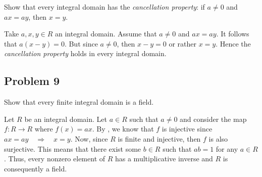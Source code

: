 \documentclass[../hw_sols.tex]{subfiles}
\begin{document}
Show that every integral domain has the \textit{cancellation property}: if 
$a \neq 0$ and $ax = ay$, then $x = y$.

\begin{solution}
Take $a,x,y \in R$ an integral domain. Assume that $a \neq 0$ and $ax = ay$. 
It follows that $a(x - y) = 0$. But since $a \neq 0$, then $x - y = 0$ or 
rather $x = y$. Hence the \textit{cancellation property} holds in every 
integral domain.
\end{solution}



\subsection*{Problem 9}

Show that every finite integral domain is a field.

\begin{solution}
Let $R$ be an integral domain. Let $a \in R$ such that $a \neq 0$ and 
consider the map $f: R \to R$ where $f(x) = ax$. By , we know 
that $f$ is injective since $ax = ay \quad \Rightarrow \quad x = y$. Now, 
since $R$ is finite and injective, then $f$ is also surjective. This means 
that there exist some $b \in R$ such that $ab = 1$ for any $a \in R$. Thus, 
every nonzero element of $R$ has a multiplicative inverse and $R$ is 
consequently a field.
\end{solution}
\end{document}
